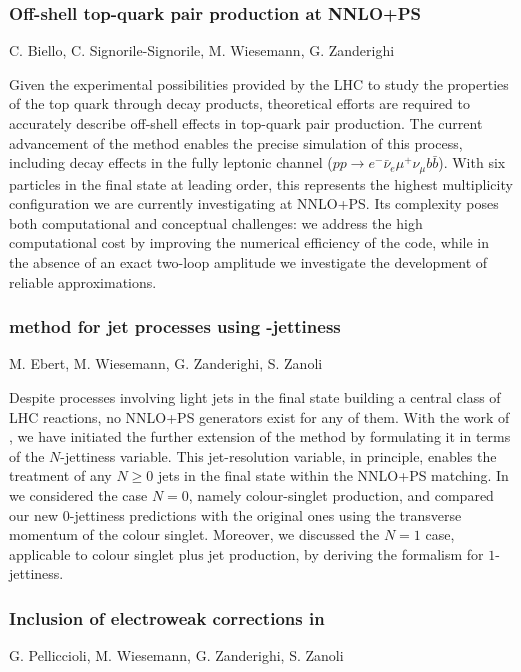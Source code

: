 \documentclass{FBR_Bericht_2025}
\begin{document}
\begin{refsection}
\subsubsection{Off-shell top-quark pair production at NNLO+PS}
\begin{Namen}
C. Biello, C. Signorile-Signorile, M. Wiesemann, G. Zanderighi
\end{Namen}
Given the experimental possibilities provided by the LHC to study the properties of the top quark through decay products, theoretical efforts are required to accurately describe off-shell effects in top-quark pair production. The current advancement of the \minnlo{} method enables the precise simulation of this process, including decay effects in the fully leptonic channel ($pp\rightarrow e^-\bar{\nu}_e\mu^+\nu_\mu b\bar b$). With six particles in the final state at leading order, this represents the highest multiplicity configuration we are currently investigating at NNLO+PS. Its complexity poses both computational and conceptual challenges: we address the high computational cost by improving the numerical efficiency of the code, while in the absence of an exact two-loop amplitude we investigate the development of reliable approximations.
% 
\subsubsection[\minnlo{} method for jet processes using $N$-jettiness]{\minnlo{} method for jet processes using -jettiness}
\begin{Namen}
M. Ebert, M. Wiesemann, G. Zanderighi, S. Zanoli
\end{Namen}
Despite processes involving light jets in the final state building a 
central class of LHC reactions, no NNLO+PS generators exist for any of them.
With the work of , we have initiated the further extension of the \minnlo{} method by
formulating it in terms of the $N$-jettiness variable. This jet-resolution variable,
in principle, enables the treatment of any $N\ge 0$ jets in the final state within the 
NNLO+PS matching. In  we considered the case $N=0$, namely colour-singlet
production, and compared our new $0$-jettiness predictions with the original \minnlo{}
ones using the transverse momentum of the colour singlet.
Moreover, we discussed the $N=1$ case, applicable to colour singlet
plus jet production, by deriving the \minnlo{} formalism for $1$-jettiness.
%
\subsubsection{Inclusion of electroweak corrections in \minnlo{}}
\begin{Namen}
G. Pelliccioli, M. Wiesemann, G. Zanderighi, S. Zanoli
\end{Namen}


\end{refsection}
\end{document}
